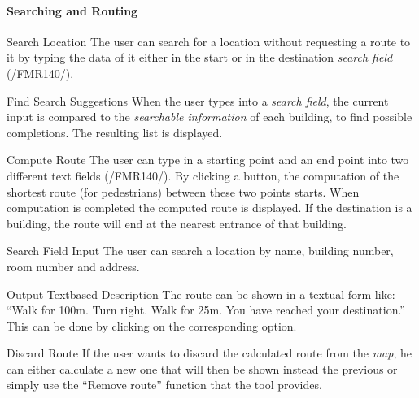 \paragraph{Searching and Routing}

\begin{numerate}[FMR]
	\item[Search Location]
The user can search for a location without requesting a route to it by typing the data of it either in the start or in the destination \textit{search field} (/FMR140/).

	\item[Find Search Suggestions]
	When the user types into a \textit{search field}, the current input is compared to the \textit{searchable information} of each building, to find possible completions. The resulting list is displayed.


\item[Compute Route]
		The user can type in a starting point and an end point into two different text fields (/FMR140/). By clicking a button,
		the computation of the shortest route (for pedestrians) between these two points starts. When computation is completed the computed route is displayed. If the destination is a building, the route will end at the nearest entrance of that building.


\item[Search Field Input]
The user can search a location by name, building number, room number and address.




\item[Output Textbased Description]
The route can be shown in a textual form like: ``Walk for 100m. Turn right. Walk for 25m. You have reached your
destination.'' This can be done by clicking on the corresponding option.

\item[Discard Route]
			If the user wants to discard the calculated route from the \textit{map}, he can either calculate a new one that will then be shown instead the previous or
			simply use the ``Remove route'' function that the tool provides.


\end{numerate}

